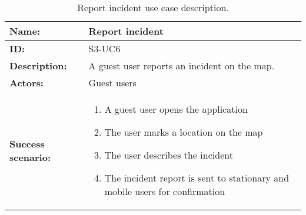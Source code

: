 \begin{table}[h!]
    \centering
    \begin{tabularx}{\textwidth}{|l|X|}
        \hline
        \textbf{Name:}  & Report incident \\ \hline
        \textbf{ID:}    & S3-UC6 \\ \hline
        \textbf{Description:} & A guest user reports an incident on the map. \\ \hline
        \textbf{Actors:} & Guest users \\ \hline
        \textbf{Success scenario:} & 
        \begin{enumerate}
            \item A guest user opens the application
            \item The user marks a location on the map
            \item The user describes the incident
            \item The incident report is sent to stationary and mobile users for confirmation
        \end{enumerate}
        \\ \hline
    \end{tabularx}
    \caption{Report incident use case description.}
    \label{tab:s3-uc6}
\end{table}